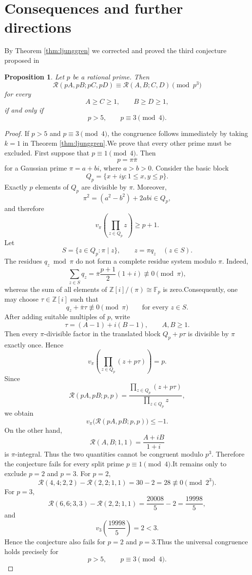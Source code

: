 \documentclass[a4paper,american,11pt]{amsart}
\numberwithin{equation}{section}
\newtheorem{proposition}[theorem]{Proposition}
\theoremstyle{definition}
\newcommand{\Rect}{\mathcal R}
\begin{document}
\section{Consequences and further directions}\label{sec:consequences}




By Theorem \ref{thm:ljunggren} we corrected and proved the third conjecture proposed in \cite{Kalinin2025} 


\begin{proposition}
    Let $p$ be a rational prime. Then$$\Rect(pA,pB;pC,pD) \equiv \Rect(A,B;C,D) \pmod{p^{3}}$$for every$$A\geq C\geq1, \qquad B\geq D\geq1,$$if and only if$$p>5, \qquad p\equiv3\pmod4.$$
\end{proposition}
\begin{proof}
    If $p>5$ and $p\equiv3\pmod4$, the congruence follows immediately by taking $k=1$ in Theorem \ref{thm:ljunggren}.We prove that every other prime must be excluded. First suppose that $p\equiv1\pmod4$. Then$$p=\pi\overline{\pi}$$for a Gaussian prime $\pi=a+bi$, where $a>b>0$. Consider the basic block$$Q_p=\{x+iy:1\leq x,y\leq p\}.$$Exactly $p$ elements of $Q_p$ are divisible by $\pi$. Moreover,$$\pi^{2}=(a^{2}-b^{2})+2abi\in Q_p,$$and therefore$$v_{\pi}\left(\prod_{z\in Q_p}z\right)\geq p+1.$$Let$$S=\{z\in Q_p:\pi\mid z\}, \qquad z=\pi q_z\quad(z\in S).$$The residues $q_z\bmod\pi$ do not form a complete residue system modulo $\pi$. Indeed,$$\sum_{z\in S}q_z = \overline{\pi}\frac{p+1}{2}(1+i) \not\equiv0\pmod\pi,$$whereas the sum of all elements of $\mathbb Z[i]/(\pi)\cong\mathbb F_p$ is zero.Consequently, one may choose $\tau\in\mathbb Z[i]$ such that$$q_z+\overline{\pi}\tau\not\equiv0\pmod\pi \qquad \text{for every }z\in S.$$After adding suitable multiples of $p$, write$$\tau=(A-1)+i(B-1), \qquad A,B\geq1.$$Then every $\pi$-divisible factor in the translated block $Q_p+p\tau$ is divisible by $\pi$ exactly once. Hence$$v_{\pi}\left(\prod_{z\in Q_p}(z+p\tau)\right)=p.$$Since$$\Rect(pA,pB;p,p) = \frac{\displaystyle\prod_{z\in Q_p}(z+p\tau)} {\displaystyle\prod_{z\in Q_p}z},$$we obtain$$v_{\pi}\bigl(\Rect(pA,pB;p,p)\bigr)\leq-1.$$On the other hand,$$\Rect(A,B;1,1)=\frac{A+iB}{1+i}$$is $\pi$-integral. Thus the two quantities cannot be congruent modulo $p^{3}$. Therefore the conjecture fails for every split prime $p\equiv1\pmod4$.It remains only to exclude $p=2$ and $p=3$. For $p=2$,$$\Rect(4,4;2,2)-\Rect(2,2;1,1) = 30-2 = 28 \not\equiv0\pmod{2^{3}}.$$For $p=3$,$$\Rect(6,6;3,3)-\Rect(2,2;1,1) = \frac{20008}{5}-2 = \frac{19998}{5},$$and$$v_3\left(\frac{19998}{5}\right)=2<3.$$Hence the conjecture also fails for $p=2$ and $p=3$.Thus the universal congruence holds precisely for$$p>5, \qquad p\equiv3\pmod4.$$
\end{proof}
\end{document}
